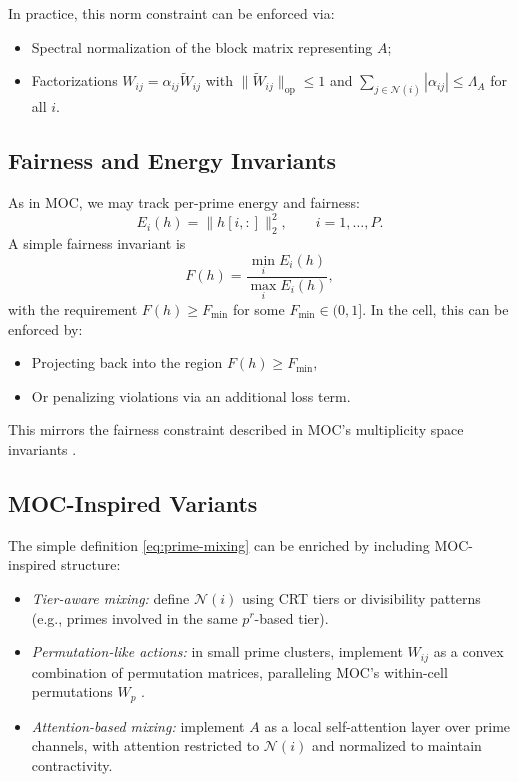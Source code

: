 \documentclass[11pt]{article}
\begin{document}
In practice, this norm constraint can be enforced via:
\begin{itemize}[leftmargin=1.5em]
  \item Spectral normalization of the block matrix representing \(A\);
  \item Factorizations \(W_{ij} = \alpha_{ij} \tilde W_{ij}\) with
  \(\|\tilde W_{ij}\|_{\mathrm{op}} \le 1\) and
  \(\sum_{j \in \mathcal{N}(i)} |\alpha_{ij}| \le \Lambda_A\) for all \(i\).
\end{itemize}

\subsection{Fairness and Energy Invariants}

As in MOC, we may track per-prime energy and fairness:
\[
  E_i(h) = \|h[i,:]\|_2^2,
  \qquad i=1,\dots,P.
\]
A simple fairness invariant is
\[
  F(h)
  =
  \frac{\min_i E_i(h)}{\max_i E_i(h)},
\]
with the requirement \(F(h) \ge F_{\min}\) for some \(F_{\min} \in (0,1]\). In
the cell, this can be enforced by:
\begin{itemize}[leftmargin=1.5em]
  \item Projecting back into the region \(F(h) \ge F_{\min}\),
  \item Or penalizing violations via an additional loss term.
\end{itemize}
This mirrors the fairness constraint described in MOC's multiplicity space
invariants \cite{MOC}.

\subsection{MOC-Inspired Variants}

The simple definition \eqref{eq:prime-mixing} can be enriched by including
MOC-inspired structure:
\begin{itemize}[leftmargin=1.5em]
  \item \emph{Tier-aware mixing:} define \(\mathcal{N}(i)\) using CRT tiers or
  divisibility patterns (e.g., primes involved in the same \(p^r\)-based tier).
  \item \emph{Permutation-like actions:} in small prime clusters, implement
  \(W_{ij}\) as a convex combination of permutation matrices, paralleling MOC's
  within-cell permutations \(W_p\) \cite{MOC}.
  \item \emph{Attention-based mixing:} implement \(A\) as a local
  self-attention layer over prime channels, with attention restricted to
  \(\mathcal{N}(i)\) and normalized to maintain contractivity.
\end{itemize}
\end{document}
